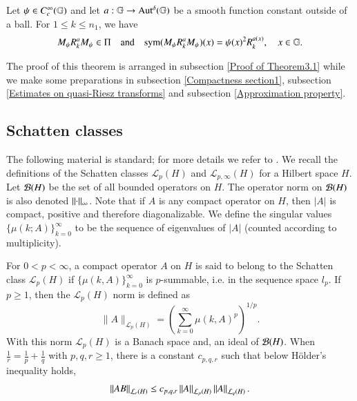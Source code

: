 \documentclass[leqno]{amsart}
\begin{document}
	\begin{theorem}\label{symbolcalcu}
		Let $\psi\in C_{c}^{\infty}(\mathbb{G})$ and let $a: \mathbb{G}\rightarrow{\rm Aut^{\delta}}(\mathbb{G})$ be a smooth function constant outside of a ball. For $1\leq k\leq n_{1}$, we have
		\begin{align*}
			M_{\psi} { R}^{a}_{k} M_{\psi}\in\Pi\quad{\rm and}\quad
			{\rm sym}(M_{\psi} { R}^{a}_{k} M_{\psi})(x)=\psi(x)^{2} { R}^{a(x)}_{k},\quad x\in\mathbb{G}.
		\end{align*}
	\end{theorem}
	The proof of this theorem is arranged in subsection \ref{Proof of Theorem3.1} while we make some preparations in subsection \ref{Compactness section1}, subsection \ref{Estimates on quasi-Riesz transforms} and subsection \ref{Approximation property}.
	
	
	\subsection{Schatten classes}\label{Spdef}
	The following material is standard; for more details we refer to \cite{LSZv1,LMSZv2}.
	We recall the definitions of the Schatten classes $\mathcal{L}_{p}(H)$ and $\mathcal{L}_{p,\infty}(H)$ for a Hilbert space $H$. Let ${\mathcal B}(H)$ be the set of all bounded operators on $H.$ 
	The operator norm on ${\mathcal B}(H)$ is also denoted $\left\| \cdot \right\|_{\infty}$.
	Note that if $A$ is any compact operator on $H$, then $|A|$ is compact, positive and therefore diagonalizable. We define the singular values $\{\mu(k;A)\}_{k=0}^{\infty}$ to be the sequence of eigenvalues of $|A|$ (counted according to multiplicity). %
	
	
	For $0<p<\infty$, a compact operator $A$ on $H$ is said to belong to the Schatten class $\mathcal{L}_p(H)$ if $\{\mu(k,A)\}_{k=0}^{\infty}$ is $p$-summable, i.e. in the sequence space $l_p.$ %
	If $p\geq 1$, then the $\mathcal{L}_p(H)$ norm is defined as
	$$\|A\|_{\mathcal{L}_p(H)}=\left(\sum_{k=0}^{\infty}\mu(k,A)^p\right)^{1/p}.$$
	With this norm $\mathcal{L}_p(H)$ is a Banach space and, an ideal of ${\mathcal B}(H)$. 
	When $\frac{1}{r}=\frac{1}{p}+\frac{1}{q}$ with $p,q,r\geq1$, there is a constant $c_{p,q,r}$ such that below H\"{o}lder's inequality holds,
	\begin{align*}
		\left\| AB \right\|_{{\mathcal L}_{r}(H)}\leq c_{p,q,r}\left\| A \right\|_{{\mathcal L}_{p}(H)}\left\| A \right\|_{{\mathcal L}_{q}(H)}.
	\end{align*}
	
\end{document}

